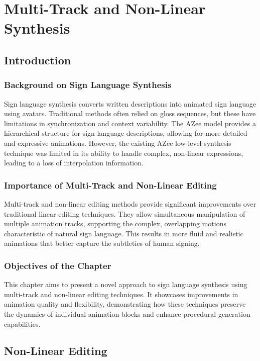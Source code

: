 \documentclass[../../main.tex]{subfiles}
\begin{document}
\chapter{Multi-Track and Non-Linear Synthesis}
\label{ch:multi_track}

\section{Introduction}

\subsection{Background on Sign Language Synthesis}
Sign language synthesis converts written descriptions into animated sign language using avatars. Traditional methods often relied on gloss sequences, but these have limitations in synchronization and context variability. The AZee model provides a hierarchical structure for sign language descriptions, allowing for more detailed and expressive animations. However, the existing AZee low-level synthesis technique was limited in its ability to handle complex, non-linear expressions, leading to a loss of interpolation information.

\subsection{Importance of Multi-Track and Non-Linear Editing}
Multi-track and non-linear editing methods provide significant improvements over traditional linear editing techniques. They allow simultaneous manipulation of multiple animation tracks, supporting the complex, overlapping motions characteristic of natural sign language. This results in more fluid and realistic animations that better capture the subtleties of human signing.

\subsection{Objectives of the Chapter}
This chapter aims to present a novel approach to sign language synthesis using multi-track and non-linear editing techniques. It showcases improvements in animation quality and flexibility, demonstrating how these techniques preserve the dynamics of individual animation blocks and enhance procedural generation capabilities.

\section{Non-Linear Editing}
\end{document}
